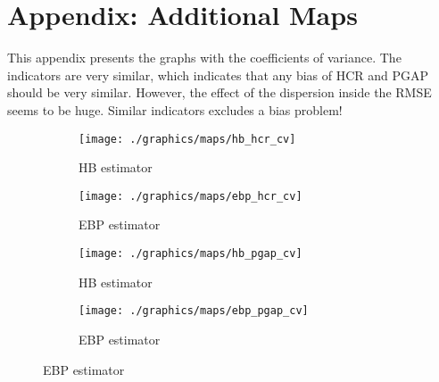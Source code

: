 \chapter{Appendix: Additional Maps}

This appendix presents the graphs with the coefficients of variance.
The indicators are very similar, which indicates that any bias of HCR and PGAP should be very similar.
However, the effect of the dispersion inside the RMSE seems to be huge.
Similar indicators excludes a bias problem!

\begin{figure}
    \begin{subfigure}{0.49\linewidth}
        \centering
        \texttt{[image: ./graphics/maps/hb\_hcr\_cv]}
        \caption{HB estimator}
    \end{subfigure}
    \begin{subfigure}{0.49\linewidth}
        \centering
        \texttt{[image: ./graphics/maps/ebp\_hcr\_cv]}
        \caption{EBP estimator}
    \end{subfigure}

    \begin{subfigure}{0.49\linewidth}
        \centering
        \texttt{[image: ./graphics/maps/hb\_pgap\_cv]}
        \caption{HB estimator}
    \end{subfigure}
    \begin{subfigure}{0.49\linewidth}
        \centering
        \texttt{[image: ./graphics/maps/ebp\_pgap\_cv]}
        \caption{EBP estimator}
    \end{subfigure}
\end{figure}